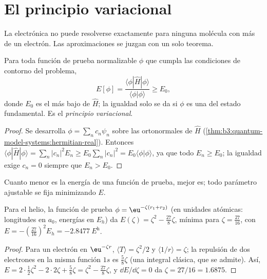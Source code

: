 \section{El principio variacional}

La  electrónica no puede resolverse exactamente para ninguna
molécula con más de un electrón. Las aproximaciones se juzgan con un solo
teorema.

\begin{theorem}\label{thm:b3:computational-chemistry:variational}
Para toda función de prueba normalizable $\phi$ que cumpla las condiciones de
contorno del problema,
\[
E[\phi] = \frac{\langle\phi|\hat H|\phi\rangle}{\langle\phi|\phi\rangle} \ge E_0,
\]
donde $E_0$ es el  más bajo de $\hat H$; la igualdad solo se da si $\phi$
es una  del estado fundamental. Es el \emph{principio
variacional}.
\end{theorem}

\begin{proof}
Se desarrolla $\phi = \sum_nc_n\psi_n$ sobre las  ortonormales de $\hat H$
(\cref{thm:b3:quantum-model-systems:hermitian-real}). Entonces $\langle\phi|\hat
H|\phi\rangle = \sum_n|c_n|^2E_n \ge E_0\sum_n|c_n|^2 = E_0\langle\phi|\phi\rangle$,
ya que todo $E_n \ge E_0$; la igualdad exige $c_n = 0$ siempre que $E_n > E_0$.
\end{proof}

Cuanto menor es la energía de una función de prueba, mejor es; todo parámetro
ajustable se fija minimizando $E$.

\begin{proposition}\label{prop:b3:computational-chemistry:helium-zeta}
Para el helio, la función de prueba $\phi = \eu^{-\zeta(r_1 + r_2)}$ (en unidades atómicas:
longitudes en $a_0$, energías en $E_h$) da $E(\zeta) = \zeta^2 - \frac{27}{8}\zeta$,
mínima para $\zeta = \frac{27}{16}$, con $E = -(\frac{27}{16})^2 E_h =
\qty{-2.8477}{\hartree}$.
\end{proposition}

\begin{proof}
Para un electrón en $\eu^{-\zeta r}$, $\langle T\rangle = \zeta^2/2$ y
$\langle 1/r\rangle = \zeta$; la repulsión de dos electrones en la misma función $1s$
es $\frac58\zeta$ (una integral clásica, que se admite). Así, $E = 2\cdot\frac12
\zeta^2 - 2\cdot2\zeta + \frac58\zeta = \zeta^2 - \frac{27}{8}\zeta$, y $\dd E/\dd
\zeta = 0$ da $\zeta = 27/16 = 1.6875$.
\end{proof}

